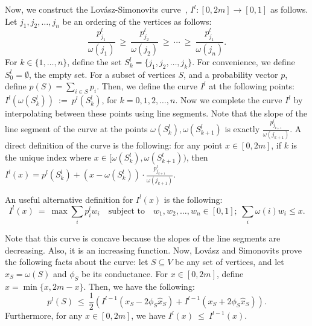 \documentclass[11pt]{article}
\newcommand\volls{\omega}
\begin{document}
Now, we construct the Lov\'{a}sz-Simonovits curve~\cite{LS90}, $I^l:[0, 2m] \rightarrow
[0, 1]$ as follows. Let $j_1, j_2, \ldots, j_n$ be an ordering of the vertices
as follows:
$$\frac{p^l_{j_1}}{\volls(j_1)}\ \geq\ \frac{p^l_{j_2}}{\volls(j_2)}\
\geq\ \cdots\ \geq\ \frac{p^l_{j_1}}{\volls(j_n)}.$$
For $k \in \{1, \ldots,
n\}$, define the set $S^l_k = \{j_1, j_2, \ldots, j_k\}$. For convenience, we
define $S^l_0 = \emptyset$, the empty set. For a subset of vertices $S$, and a
probability vector $p$, define $p(S) = \sum_{i \in S} p_i$. Then, we define
the curve $I^l$ at the following points: $I^l(\volls(S^l_k))\ :=\ p^l(S^l_k)$,
for $k = 0, 1, 2, \ldots, n.$ Now we complete the curve $I^l$ by
interpolating between these points using line segments. Note that the slope of
the line segment of the curve at the points $\volls(S^l_k), \volls(S^l_{k+1})$ is
exactly $\frac{p^l_{j_{k+1}}}{\volls(j_{k+1})}$.  A direct definition of the
curve is the following: for any point $x \in [0, 2m]$, if $k$ is the unique
index where $x \in [\volls(S^l_k), \volls(S^l_{k+1}))$, then $I^l(x) = p^l(S^l_k) +
(x - \volls(S^l_k))\cdot \frac{p^l_{j_{k+1}}}{\volls(j_{k+1})}.$

An useful alternative definition for $I^l(x)$ is the following:
\begin{equation}\label{eq:alt-def}
I^l(x)\ =\ \max \sum_i p^l_i w_i \quad \text{subject to} \quad w_1, w_2, \ldots, w_n \in [0, 1];\ \sum_i \volls(i) w_i \leq x.
\end{equation}

Note that this curve is concave because the slopes of the line segments are
decreasing. Also, it is an increasing function. Now, Lov\'{a}sz and Simonovits prove the following facts about the
curve: let $S \subseteq V$ be any set of vertices, and let $x_S = \volls(S)$ and $\phi_S$ be its conductance.
For $x \in [0, 2m]$, define $\hat{x} =
\min\{x, 2m - x\}$. Then, we have the following:
\begin{equation} \label{eq:ls-chords}
p^l(S)\ \leq\ \frac{1}{2}(I^{l-1}(x_S - 2\phi_S \hat{x}_S) + I^{l-1}(x_S + 2\phi_S \hat{x}_S)).
\end{equation}
Furthermore, for any $x \in [0, 2m]$, we have
$I^l(x)\ \leq\ I^{l-1}(x)$.
\end{document}
